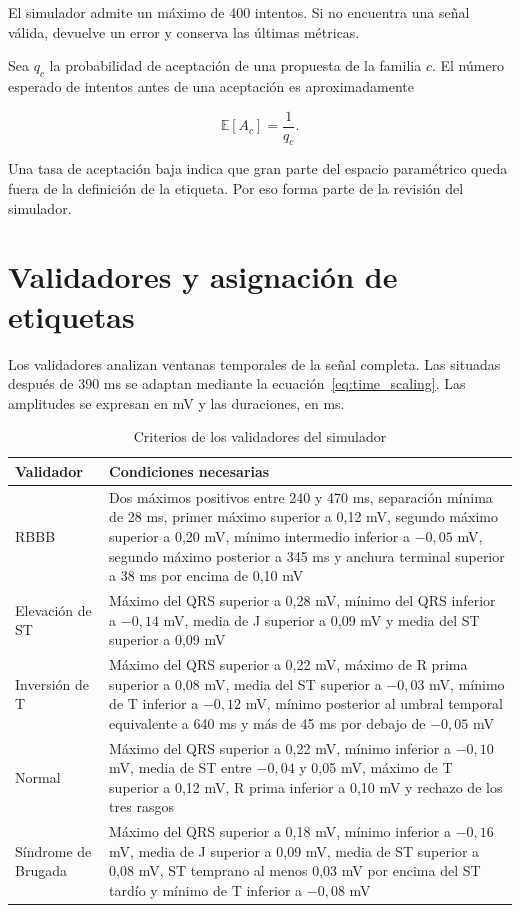 El simulador admite un máximo de 400 intentos. Si no encuentra una señal válida, devuelve un error y conserva las últimas métricas.

Sea \(q_c\) la probabilidad de aceptación de una propuesta de la familia \(c\). El número esperado de intentos antes de una aceptación es aproximadamente

\begin{equation}
\mathbb{E}[A_c] =
\frac{1}{q_c}.
\end{equation}

Una tasa de aceptación baja indica que gran parte del espacio paramétrico queda fuera de la definición de la etiqueta. Por eso forma parte de la revisión del simulador.

\section{Validadores y asignación de etiquetas}

Los validadores analizan ventanas temporales de la señal completa. Las situadas después de 390 ms se adaptan mediante la ecuación~\ref{eq:time_scaling}. Las amplitudes se expresan en mV y las duraciones, en ms.

\begin{table}[H]
\centering
\scriptsize
\begin{tabularx}{\textwidth}{p{2.25cm} X}
\toprule
\textbf{Validador} & \textbf{Condiciones necesarias} \\
\midrule
RBBB &
Dos máximos positivos entre 240 y 470 ms, separación mínima de 28 ms, primer máximo superior a 0,12 mV, segundo máximo superior a 0,20 mV, mínimo intermedio inferior a \(-0,05\) mV, segundo máximo posterior a 345 ms y anchura terminal superior a 38 ms por encima de 0,10 mV \\
Elevación de ST &
Máximo del QRS superior a 0,28 mV, mínimo del QRS inferior a \(-0,14\) mV, media de J superior a 0,09 mV y media del ST superior a 0,09 mV \\
Inversión de T &
Máximo del QRS superior a 0,22 mV, máximo de R prima superior a 0,08 mV, media del ST superior a \(-0,03\) mV, mínimo de T inferior a \(-0,12\) mV, mínimo posterior al umbral temporal equivalente a 640 ms y más de 45 ms por debajo de \(-0,05\) mV \\
Normal &
Máximo del QRS superior a 0,22 mV, mínimo inferior a \(-0,10\) mV, media de ST entre \(-0,04\) y 0,05 mV, máximo de T superior a 0,12 mV, R prima inferior a 0,10 mV y rechazo de los tres rasgos \\
Síndrome de Brugada &
Máximo del QRS superior a 0,18 mV, mínimo inferior a \(-0,16\) mV, media de J superior a 0,09 mV, media de ST superior a 0,08 mV, ST temprano al menos 0,03 mV por encima del ST tardío y mínimo de T inferior a \(-0,08\) mV \\
\bottomrule
\end{tabularx}
\caption{Criterios de los validadores del simulador}
\label{tab:validadores}
\end{table}

